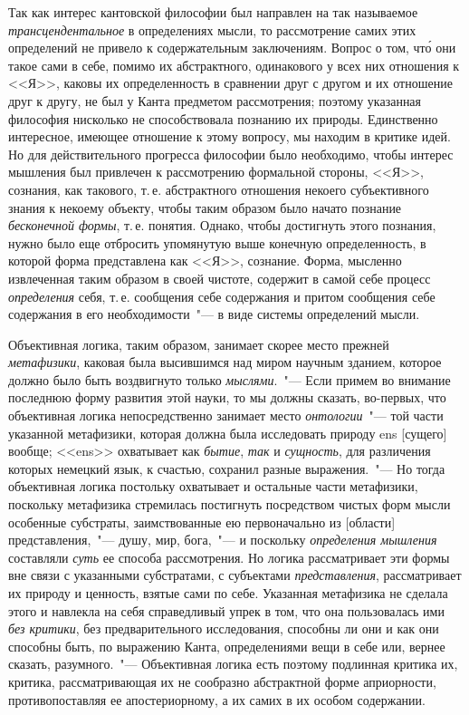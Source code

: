 Так как интерес кантовской философии был направлен
на так называемое \emph{трансцендентальное} в определениях
мысли, то рассмотрение самих этих определений не
привело к содержательным заключениям. Вопрос о том,
чт\'о они такое сами в себе, помимо их абстрактного, одинакового
у всех них отношения к <<Я>>, каковы их определенность
в сравнении друг с другом и их отношение
друг к другу, не был у Канта предметом рассмотрения;
поэтому указанная философия нисколько не способствовала
познанию их природы. Единственно интересное,
имеющее отношение к этому вопросу, мы находим в критике
идей. Но для действительного прогресса философии
было необходимо, чтобы интерес мышления был привлечен
к рассмотрению формальной стороны, <<Я>>, сознания,
как такового, т.\,е. абстрактного отношения некоего субъективного
знания к некоему объекту, чтобы таким образом
было начато познание \emph{бесконечной формы}, т.\,е. понятия.
Однако, чтобы достигнуть этого познания, нужно
было еще отбросить упомянутую выше конечную определенность,
в которой форма представлена как <<Я>>, сознание.
Форма, мысленно извлеченная таким образом
в своей чистоте, содержит в самой себе процесс \emph{определения}
себя, т.\,е. сообщения себе содержания и притом сообщения
себе содержания в его необходимости~"--- в виде
системы определений мысли.

Объективная логика, таким образом, занимает скорее
место прежней \emph{метафизики}, каковая была высившимся
над миром научным зданием, которое должно было быть
воздвигнуто только \emph{мыслями}.~"--- Если примем во внимание
последнюю форму развития этой науки\endnotemark{}, то мы
должны сказать, во-первых, что объективная логика непосредственно
занимает место \emph{онтологии}~"--- той части указанной
метафизики, которая должна была исследовать
природу ens [сущего] вообще; <<ens>> охватывает как \emph{бытие},
\emph{так} и \emph{сущность}, для различения которых немецкий
язык, к счастью, сохранил разные выражения.~"--- Но тогда
объективная логика постольку охватывает и остальные
части метафизики, поскольку метафизика стремилась
постигнуть посредством чистых форм мысли особенные
субстраты, заимствованные ею первоначально из [области]
представления,~"--- душу, мир, бога,~"--- и поскольку
\emph{определения мышления} составляли \emph{суть} ее способа рассмотрения.
Но логика рассматривает эти формы вне связи
с указанными субстратами, с субъектами \emph{представления},
рассматривает их природу и ценность, взятые
сами по себе. Указанная метафизика не сделала этого
и навлекла на себя справедливый упрек в том, что она
пользовалась ими \emph{без критики}, без предварительного исследования,
способны ли они и как они способны быть,
по выражению Канта, определениями вещи в себе или,
вернее сказать, разумного.~"--- Объективная логика есть
поэтому подлинная критика их, критика, рассматривающая
их не сообразно абстрактной форме априорности,
противопоставляя ее апостериорному, а их самих в их
особом содержании.

